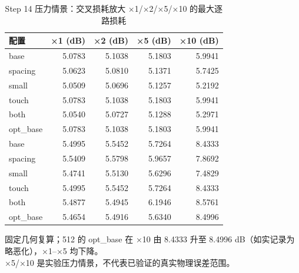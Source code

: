 \begin{table}[htbp]
  \centering
  \caption{Step 14 压力情景：交叉损耗放大 ×1/×2/×5/×10 的最大逐路损耗}
  \label{tab:step14-sensitivity}
  \begin{tabular}{lrrrr}
    \toprule
    配置 & ×1 (dB) & ×2 (dB) & ×5 (dB) & ×10 (dB) \\
    \midrule
    base & 5.0783 & 5.1038 & 5.1803 & 5.9941 \\
    spacing & 5.0623 & 5.0810 & 5.1371 & 5.7425 \\
    small & 5.0509 & 5.0696 & 5.1257 & 5.2192 \\
    touch & 5.0783 & 5.1038 & 5.1803 & 5.9941 \\
    both & 5.0540 & 5.0727 & 5.1288 & 5.2971 \\
    opt\_base & 5.0783 & 5.1038 & 5.1803 & 5.9941 \\
    \midrule
    base & 5.4995 & 5.5452 & 5.7264 & 8.4333 \\
    spacing & 5.5409 & 5.5798 & 5.9657 & 7.8692 \\
    small & 5.4741 & 5.5130 & 5.6296 & 7.4829 \\
    touch & 5.4995 & 5.5452 & 5.7264 & 8.4333 \\
    both & 5.4877 & 5.4945 & 6.1946 & 8.5761 \\
    opt\_base & 5.4654 & 5.4916 & 5.6340 & 8.4996 \\
    \bottomrule
  \end{tabular}
  \par\vspace{2pt}
  \begin{flushleft}\footnotesize
  固定几何复算；512 的 opt\_base 在 ×10 由 8.4333 升至 8.4996 dB（如实记录为略恶化），×1–×5 均下降。 \\
  ×5/×10 是实验压力情景，不代表已验证的真实物理误差范围。 \\
  \end{flushleft}
\end{table}
